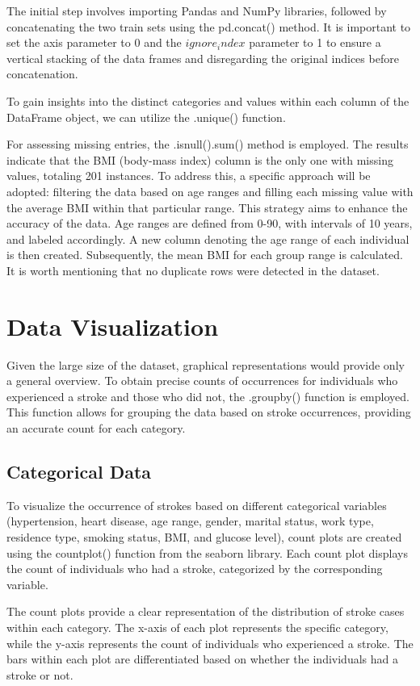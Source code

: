 \documentclass{article}
\begin{document}
The initial step involves importing Pandas and NumPy libraries, followed by concatenating the two train sets using the pd.concat() method. It is important to set the axis parameter to 0 and the $ignore_index$ parameter to 1 to ensure a vertical stacking of the data frames and disregarding the original indices before concatenation.

To gain insights into the distinct categories and values within each column of the DataFrame object, we can utilize the .unique() function.

For assessing missing entries, the .isnull().sum() method is employed. The results indicate that the BMI (body-mass index) column is the only one with missing values, totaling 201 instances. To address this, a specific approach will be adopted: filtering the data based on age ranges and filling each missing value with the average BMI within that particular range. This strategy aims to enhance the accuracy of the data. Age ranges are defined from 0-90, with intervals of 10 years, and labeled accordingly. A new column denoting the age range of each individual is then created. Subsequently, the mean BMI for each group range is calculated. It is worth mentioning that no duplicate rows were detected in the dataset.

\section{Data Visualization}

Given the large size of the dataset, graphical representations would provide only a general overview. To obtain precise counts of occurrences for individuals who experienced a stroke and those who did not, the .groupby() function is employed. This function allows for grouping the data based on stroke occurrences, providing an accurate count for each category.

\subsection{Categorical Data}
To visualize the occurrence of strokes based on different categorical variables (hypertension, heart disease, age range, gender, marital status, work type, residence type, smoking status, BMI, and glucose level), count plots are created using the countplot() function from the seaborn library. Each count plot displays the count of individuals who had a stroke, categorized by the corresponding variable.

The count plots provide a clear representation of the distribution of stroke cases within each category. The x-axis of each plot represents the specific category, while the y-axis represents the count of individuals who experienced a stroke. The bars within each plot are differentiated based on whether the individuals had a stroke or not.
\end{document}
